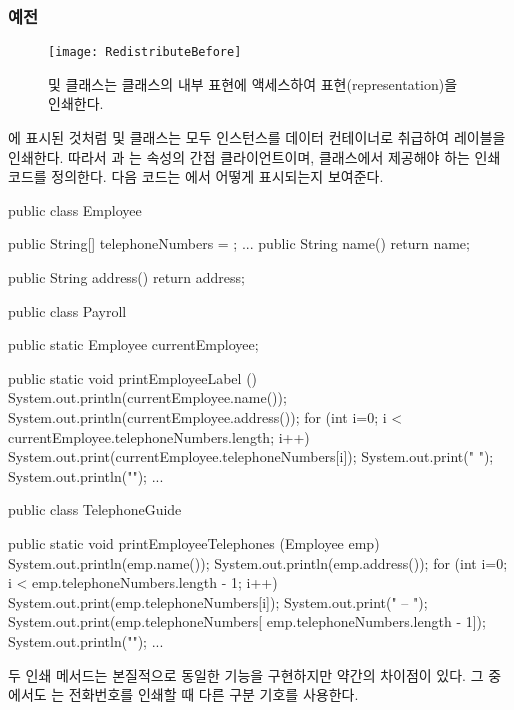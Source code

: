 \documentclass[a4paper,10pt,twoside]{book}
\begin{document}
\subsubsection*{예전}

\begin{figure}
\begin{center}
\texttt{[image: RedistributeBefore]}
\caption{ 및  클래스는  클래스의 내부 표현에 액세스하여 표현(representation)을 인쇄한다.}
\end{center}
\end{figure}

에 표시된 것처럼  및  클래스는 모두  인스턴스를 데이터 컨테이너로 취급하여 레이블을 인쇄한다. 따라서 과 는  속성의 간접 클라이언트이며,  클래스에서 제공해야 하는 인쇄 코드를 정의한다. 다음 코드는 에서 어떻게 표시되는지 보여준다.

\begin{code}
public class Employee {
	public String[] telephoneNumbers = {};
	...
	public String name() {
		return name;}
	
	public String address() {
		return address;}
}

public class Payroll {

	public static Employee currentEmployee;

	public static void printEmployeeLabel () {
		System.out.println(currentEmployee.name());
		System.out.println(currentEmployee.address());
		for (int i=0; i < currentEmployee.telephoneNumbers.length; i++) {
			System.out.print(currentEmployee.telephoneNumbers[i]);
			System.out.print(" ");}
		System.out.println("");}
...
}

public class TelephoneGuide {

	public static void printEmployeeTelephones (Employee emp) {
		System.out.println(emp.name());
		System.out.println(emp.address());
		for (int i=0; i < emp.telephoneNumbers.length - 1; i++) {
			System.out.print(emp.telephoneNumbers[i]);
			System.out.print(" -- ");}
		System.out.print(emp.telephoneNumbers[
				emp.telephoneNumbers.length - 1]);
		System.out.println("");}
	...
}
\end{code}

두 인쇄 메서드는 본질적으로 동일한 기능을 구현하지만 약간의 차이점이 있다. 그 중에서도 는 전화번호를 인쇄할 때 다른 구분 기호를 사용한다.
\end{document}
